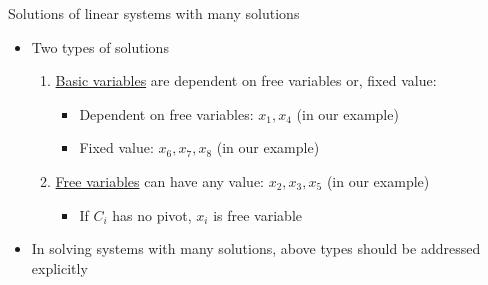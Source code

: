 \documentclass[final]{beamer}
\begin{document}
\begin{frame}[t]{Solutions of linear systems with many solutions}
	\begin{itemize}
		\item Two types of solutions
		\begin{enumerate}
			\item \uline{Basic variables} are dependent on free variables or, fixed value:
			\begin{itemize}
				\item Dependent on free variables: $x_1,x_4$ (in our example)
				\item Fixed value: $x_6,x_7,x_8$ (in our example)
			\end{itemize}
			\item \uline{Free variables} can have any value: $x_2,x_3,x_5$ (in our example)
			\begin{itemize}
				\item If $C_i$ has no pivot, $x_i$ is free variable
			\end{itemize}
		\end{enumerate}
		\item In solving systems with many solutions, above types should be addressed explicitly
	\end{itemize}
\end{frame}
\end{document}
